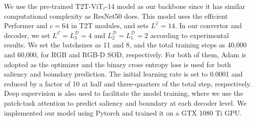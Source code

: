 \documentclass[10pt,twocolumn,letterpaper]{article}
\begin{document}
We use the pre-trained T2T-ViT$_t$-14 \cite{yuan2021tokens} model as our backbone since it has similar computational complexity as ResNet50 \cite{he2016resnet} does. This model uses the efficient Performer \cite{2020performer} and $c=64$ in T2T modules, and sets $L^{\mathcal{E}}=14$. In our convertor and decoder, we set $L^{\mathcal{C}}=L^{\mathcal{D}}_3=4$ and $L^{\mathcal{D}}_2=L^{\mathcal{D}}_1=2$ according to experimental results.
We set the batchsizes as 11 and 8, and the total training steps as 40,000 and 60,000, for RGB and RGB-D SOD, respectively.
For both of them, Adam \cite{Adam2015} is adopted as the optimizer and the binary cross entropy loss is used for both saliency and boundary prediction.
The initial learning rate is set to 0.0001 and reduced by a factor of 10 at half and three-quarters of the total step, respectively.
Deep supervision is also used to facilitate the model training, where we use the patch-task attention to predict saliency and boundary at each decoder level.
We implemented our model using Pytorch \cite{paszke2019pytorch} and trained it on a GTX 1080 Ti GPU.
\end{document}
